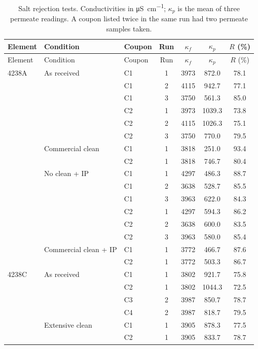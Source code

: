 {\footnotesize
\begin{longtable}{lllcccc}
  \caption{Salt rejection tests. Conductivities in \unit{\micro S.cm^{-1}}; $\kappa_p$ is the mean of three permeate readings. A coupon listed twice in the same run had two permeate samples taken.}
  \label{tab:app-rejection}\\
  \toprule
  Element & Condition & Coupon & Run & $\kappa_f$ & $\kappa_p$ & $R$ (\%) \\
  \midrule
  \endfirsthead
  \toprule
  Element & Condition & Coupon & Run & $\kappa_f$ & $\kappa_p$ & $R$ (\%) \\
  \midrule
  \endhead
  \bottomrule
  \endfoot
  4238A & As received & C1 & 1 & 3973 & 872.0 & 78.1 \\
   &  & C1 & 2 & 4115 & 942.7 & 77.1 \\
   &  & C1 & 3 & 3750 & 561.3 & 85.0 \\
   &  & C2 & 1 & 3973 & 1039.3 & 73.8 \\
   &  & C2 & 2 & 4115 & 1026.3 & 75.1 \\
   &  & C2 & 3 & 3750 & 770.0 & 79.5 \\
  \addlinespace
   & Commercial clean & C1 & 1 & 3818 & 251.0 & 93.4 \\
   &  & C2 & 1 & 3818 & 746.7 & 80.4 \\
  \addlinespace
   & No clean + IP & C1 & 1 & 4297 & 486.3 & 88.7 \\
   &  & C1 & 2 & 3638 & 528.7 & 85.5 \\
   &  & C1 & 3 & 3963 & 622.0 & 84.3 \\
   &  & C2 & 1 & 4297 & 594.3 & 86.2 \\
   &  & C2 & 2 & 3638 & 600.0 & 83.5 \\
   &  & C2 & 3 & 3963 & 580.0 & 85.4 \\
  \addlinespace
   & Commercial clean + IP & C1 & 1 & 3772 & 466.7 & 87.6 \\
   &  & C2 & 1 & 3772 & 503.3 & 86.7 \\
  \midrule
  4238C & As received & C1 & 1 & 3802 & 921.7 & 75.8 \\
   &  & C2 & 1 & 3802 & 1044.3 & 72.5 \\
   &  & C3 & 2 & 3987 & 850.7 & 78.7 \\
   &  & C4 & 2 & 3987 & 818.7 & 79.5 \\
  \addlinespace
   & Extensive clean & C1 & 1 & 3905 & 878.3 & 77.5 \\
   &  & C2 & 1 & 3905 & 833.7 & 78.7 \\

\end{longtable}}
